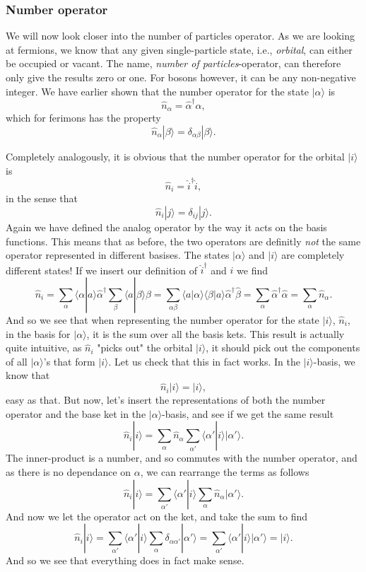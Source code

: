\documentclass[a4paper, 11pt, notitlepage, english]{article}
\newcommand{\ket}[1]{|#1 \rangle}
\newcommand{\braket}[2]{\langle #1 | #2 \rangle}
\newcommand{\op}[1]{\hat{#1}}
\begin{document}
\subsubsection*{Number operator}
We will now look closer into the number of particles operator. As we are looking at fermions, we know that any given single-particle state, i.e., \emph{orbital}, can either be occupied or vacant. The name, \emph{number of particles}-operator, can therefore only give the results zero or one. For bosons however, it can be any non-negative integer. We have earlier shown that the number operator for the state $\ket{\alpha}$ is
$$\op{n}_\alpha = \op{\alpha}^\dag \op{\alpha},$$
which for ferimons has the property
$$\op{n}_\alpha \ket{\beta} = \delta_{\alpha\beta}\ket{\beta}.$$

Completely analogously, it is obvious that the number operator for the orbital $\ket{i}$ is
$$\op{n}_i = \op{i}^\dag \op{i},$$
in the sense that
$$\op{n}_i \ket{j} = \delta_{ij}\ket{j}.$$
Again we have defined the analog operator by the way it acts on the basis functions. This means that as before, the two operators are definitly \emph{not} the same operator represented in different basises. The states $\ket{\alpha}$ and $\ket{i}$ are completely different states! If we insert our definition of $\op{i}^\dag$ and $\op{i}$ we find
$$\op{n}_i = \sum_{\alpha}\braket{\alpha}{a}\op{\alpha}^\dag \sum_{\beta} \braket{a}{\beta}\op{\beta} = \sum_{\alpha\beta} \braket{a}{\alpha}\braket{\beta}{a} \op{\alpha}^\dag \op{\beta} = \sum_\alpha \op{\alpha}^\dag \op{\alpha} = \sum_\alpha \op{n}_\alpha.$$
And so we see that when representing the number operator for the state $\ket{i}$, $\op{n}_i$, in the basis for $\ket{\alpha}$, it is the sum over all the basis kets. This result is actually quite intuitive, as $\op{n}_i$ "picks out" the orbital $\ket{i}$, it should pick out the components of all $\ket{\alpha}$'s that form $\ket{i}$. Let us check that this in fact works. In the $\ket{i}$-basis, we know that
$$\op{n}_i \ket{i} = \ket{i},$$
easy as that. But now, let's insert the representations of both the number operator and the base ket in the $\ket{\alpha}$-basis, and see if we get the same result
$$\op{n}_i \ket{i} = \sum_{\alpha}\op{n}_\alpha \sum_{\alpha'}\braket{\alpha'}{i}\ket{\alpha'}.$$
The inner-product is a number, and so commutes with the number operator, and as there is no dependance on $\alpha$, we can rearrange the terms as follows
$$\op{n}_i \ket{i} =  \sum_{\alpha'}\braket{\alpha'}{i} \sum_{\alpha}\op{n}_\alpha\ket{\alpha'}.$$
And now we let the operator act on the ket, and take the sum to find 
$$\op{n}_i \ket{i} = \sum_{\alpha'}\braket{\alpha'}{i} \sum_{\alpha} \delta_{\alpha \alpha'}\ket{\alpha'} = \sum_{\alpha'} \braket{\alpha'}{i}\ket{\alpha'} = \ket{i}.$$
And so we see that everything does in fact make sense.
\end{document}
